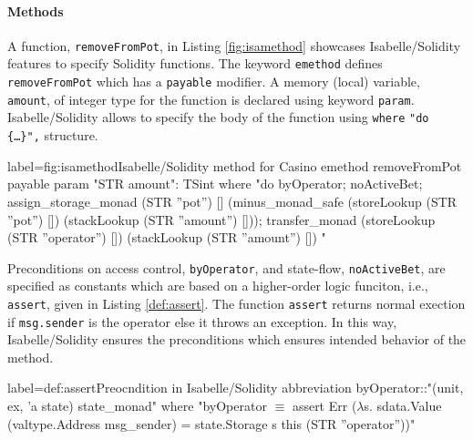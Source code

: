 \documentclass[a4paper,UKenglish,cleveref, autoref, thm-restate]{oasics-v2021}
\begin{document}
\paragraph*{Methods}
%
%
%
%
%
%
%
A function, \texttt{removeFromPot}, in Listing \ref{fig:isamethod} showcases Isabelle/Solidity features to specify Solidity functions.
%
The keyword \texttt{\color{isargreen}emethod} defines \texttt{removeFromPot} which has a \texttt{\color{isargreen}payable}  modifier. 
%
A memory (local) variable, \texttt{amount}, of  integer type for the function is declared using keyword  \texttt{\color{isargreen}param}.
%
Isabelle/Solidity allows to specify the body of the function using \texttt{\color{isargreen}where} \texttt{"do \{\dots\}",} structure.
%
%
\begin{isabelle}{label={fig:isamethod}}{Isabelle/Solidity method for Casino}
emethod removeFromPot payable
  param "STR amount": TSint
where
  "do {
    byOperator;
    noActiveBet;
    assign_storage_monad (STR ''pot'') [] 
	(minus_monad_safe (storeLookup (STR ''pot'') []) 
		(stackLookup (STR ''amount'') []));
    transfer_monad (storeLookup (STR ''operator'') []) 
	(stackLookup (STR ''amount'') [])
  }"
\end{isabelle}
%

%
Preconditions on access control, \texttt{byOperator}, and state-flow, \texttt{noActiveBet}, are specified as constants which are based on a higher-order logic funciton, i.e., \texttt{assert}, given in Listing \ref{def:assert}. 
%
The function \texttt{assert} returns normal exection if \texttt{msg.sender} is the operator else it throws an exception.
%
In this way, Isabelle/Solidity ensures the preconditions which ensures intended behavior of the method.
%
\begin{isabelle}{label={def:assert}}{Preocndition in Isabelle/Solidity}
abbreviation byOperator::"(unit, ex, 'a state) state_monad" where
 "byOperator $\equiv$ assert Err ($\lambda$s. sdata.Value (valtype.Address msg_sender)
			 = state.Storage s this (STR ''operator''))"
\end{isabelle}
\end{document}
